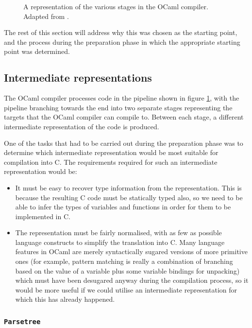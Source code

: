 \documentclass[12pt,a4paper,twoside,openright]{report}
\begin{document}
\begin{figure}
    \label{fig:compilerstages}
    \centering
    
    \caption{A representation of the various stages in the OCaml compiler. 
    Adapted from \cite[Chapter~22]{realworldocaml}.}
\end{figure}

The rest of this section will address why this was chosen as the starting 
point, and the process during the preparation phase in which the appropriate 
starting point was determined.

\subsection{Intermediate representations}

The OCaml compiler processes code in the pipeline shown in figure 
\ref{fig:compilerstages}, with the pipeline branching towards the end into two 
separate stages representing the targets that the OCaml compiler can compile 
to. Between each stage, a different intermediate representation of the code is 
produced.

One of the tasks that had to be carried out during the preparation phase was 
to determine which intermediate representation would be most suitable for 
compilation into C. The requirements required for such an intermediate 
representation would be:

\begin{itemize}
\item It must be easy to recover type information from the representation. This 
is because the resulting C code must be statically typed also, so we need to be 
able to infer the types of variables and functions in order for them to be 
implemented in C.
\item The representation must be fairly normalised, with as few as possible 
language constructs to simplify the translation into C. Many language features 
in OCaml are merely syntactically sugared versions of more primitive ones (for 
example, pattern matching is really a combination of branching based on the 
value of a variable plus some variable bindings for unpacking) which must have 
been desugared anyway during the compilation process, so it would be more 
useful if we could utilise an intermediate representation for which this has 
already happened.
\end{itemize}

\subsubsection{\texttt{Parsetree}}
\end{document}
